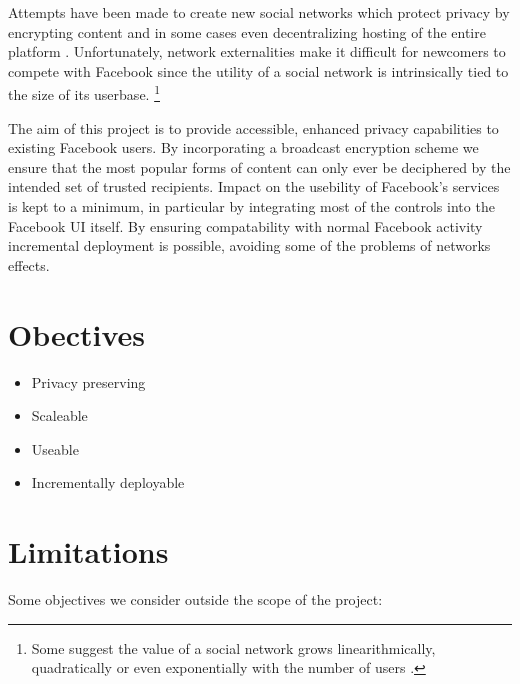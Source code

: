 Attempts have been made to create new social networks which protect privacy by encrypting content and in some cases even decentralizing hosting of the entire platform \cite{pidder} \cite{diaspora}. Unfortunately, network externalities make it difficult for newcomers to compete with Facebook since the utility of a social network is intrinsically tied to the size of its userbase. \footnote{Some suggest the value of a social network grows linearithmically, quadratically or even exponentially with the number of users \cite{fb-network} \cite{metcalf}.}

The aim of this project is to provide accessible, enhanced privacy capabilities to existing Facebook users. By incorporating a broadcast encryption scheme we ensure that the most popular forms of content can only ever be deciphered by the intended set of trusted recipients. Impact on the usebility of Facebook's services is kept to a minimum, in particular by integrating most of the controls into the Facebook UI itself. By ensuring compatability with normal Facebook activity incremental deployment is possible, avoiding some of the problems of networks effects.


\section{Obectives}
\label{sec:objectives}

\begin{itemize}

    \item Privacy preserving

    \item Scaleable
    
    \item Useable
    
    \item Incrementally deployable

\end{itemize}


\section{Limitations}
\label{sec:limit}

Some objectives we consider outside the scope of the project:

